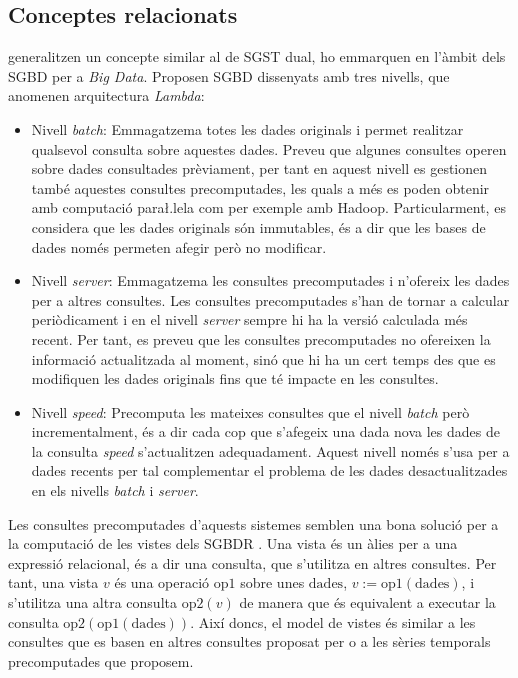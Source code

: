 


\subsection{Conceptes relacionats}


\textcite{marz13:nosql13, marz14:bigdata} generalitzen un concepte
similar al de \gls{SGST} dual, ho emmarquen en l'àmbit dels \gls{SGBD}
per a \emph{Big Data}.  Proposen \gls{SGBD} dissenyats amb tres
nivells, que anomenen arquitectura \emph{Lambda}:
\begin{itemize}
\item Nivell \emph{batch}: Emmagatzema totes les dades originals i
  permet realitzar qualsevol consulta sobre aquestes dades. Preveu que
  algunes consultes operen sobre dades consultades prèviament, per
  tant en aquest nivell es gestionen també aquestes consultes
  precomputades, les quals a més es poden obtenir amb computació
  para\l.lela com per exemple amb Hadoop. Particularment, es considera
  que les dades originals són immutables, és a dir que les bases de
  dades només permeten afegir però no modificar.

\item Nivell \emph{server}: Emmagatzema les consultes precomputades i
  n'ofereix les dades per a altres consultes. Les consultes
  precomputades s'han de tornar a calcular periòdicament i en el
  nivell \emph{server} sempre hi ha la versió calculada més
  recent. Per tant, es preveu que les consultes precomputades no
  ofereixen la informació actualitzada al moment, sinó que hi ha un
  cert temps des que es modifiquen les dades originals fins que té
  impacte en les consultes.

\item Nivell \emph{speed}: Precomputa les mateixes consultes que el
  nivell \emph{batch} però incrementalment, és a dir cada cop que
  s'afegeix una dada nova les dades de la consulta \emph{speed}
  s'actualitzen adequadament.  Aquest nivell només s'usa per a dades
  recents per tal complementar el problema de les dades
  desactualitzades en els nivells \emph{batch} i \emph{server}.
\end{itemize}


Les consultes precomputades d'aquests sistemes semblen una bona
solució per a la computació de les vistes dels \gls{SGBDR} .  Una vista
és un àlies per a una expressió relacional, és a dir una consulta, que
s'utilitza en altres consultes. Per tant, una vista $v$ és una
operació $\text{op1}$ sobre unes $\text{dades}$,
$v:=\text{op1}(\text{dades})$, i s'utilitza una altra consulta
$\text{op2}(v)$ de manera que és equivalent a executar la consulta
$\text{op2}(\text{op1}(\text{dades}))$. Així doncs, el model de vistes
és similar a les consultes que es basen en altres consultes proposat
per \citeauthor{marz14:bigdata} o a les sèries temporals precomputades
que proposem.


